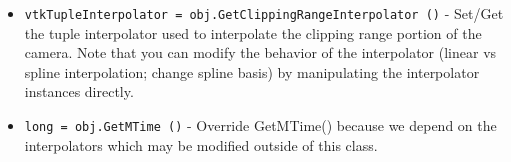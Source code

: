 \begin{itemize}
\item  \verb|vtkTupleInterpolator = obj.GetClippingRangeInterpolator ()| -  Set/Get the tuple interpolator used to interpolate the clipping range portion
 of the camera. Note that you can modify the behavior of the interpolator
 (linear vs spline interpolation; change spline basis) by manipulating
 the interpolator instances directly.

\item  \verb|long = obj.GetMTime ()| -  Override GetMTime() because we depend on the interpolators which may be
 modified outside of this class.

\end{itemize}
